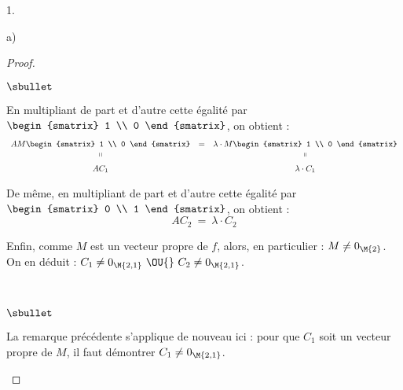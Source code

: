 \begin{noliste}{1.}
\begin{noliste}{a)}
\begin{proof}
\begin{noliste}{$\sbullet$}
      \item En multipliant de part et d'autre cette égalité par $
        \begin{smatrix}
          1 \\
          0
        \end{smatrix}
        $, on obtient :
        \[
        \begin{array}{ccc}
          AM 
          \begin{smatrix}
            1 \\
            0
          \end{smatrix}
          & = &
          \lambda \cdot M 
          \begin{smatrix}
            1 \\
            0
          \end{smatrix}
          \\
          \shortparallel & & \shortparallel
          \\[.2cm]
          A C_1 & & \lambda \cdot C_1
        \end{array}
        \]


        \newpage


      \item De même, en multipliant de part et d'autre cette égalité par $
        \begin{smatrix}
          0 \\
          1
        \end{smatrix}
        $, on obtient :
        \[
        A C_2 \ = \ \lambda \cdot C_2
        \]

      \item Enfin, comme $M$ est un vecteur propre de $f$, alors, en
        particulier : $M \neq 0_{\M{2}}$.\\
        On en déduit : $C_1 \neq 0_{\M{2,1}} \ \OU{} \ C_2 \neq
        0_{\M{2,1}}$.
      \end{noliste}
      \begin{remark}~
        \begin{noliste}{$\sbullet$}
        \item La remarque précédente s'applique de nouveau ici : pour
          que $C_1$ soit un vecteur propre de $M$, il faut démontrer
          $C_1 \neq 0_{\M{2,1}}$.


\end{noliste}
\end{remark}
\end{proof}
\end{noliste}
\end{noliste}

